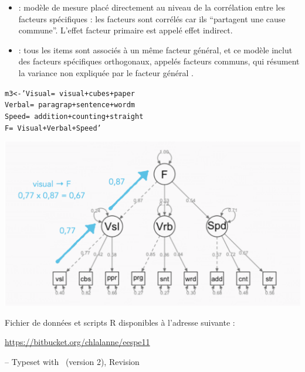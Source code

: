 
\begin{itemize}
\item {} : modèle de mesure placé directement au
  niveau de la corrélation entre les facteurs spécifiques : les facteurs sont
  corrélés car ils \enquote{partagent une cause commune}. L'effet facteur
  primaire est appelé effet indirect.
\item {} : tous les items sont associés à un même
  facteur général, et ce modèle inclut des facteurs spécifiques orthogonaux,
  appelés facteurs communs, qui résument la variance non expliquée par le
  facteur général \autocite{reise10}.
\end{itemize}


\begin{alltt}
m3 <- 'Visual =~ visual + cubes + paper
       Verbal =~ paragrap + sentence + wordm
       Speed  =~ addition + counting + straight
       F =~ Visual + Verbal + Speed'
\end{alltt}

{\centering \includegraphics[width=.5\textwidth]{figs/m4.eps}\par}


\foilhead{}

Fichier de données et scripts R disponibles à l'adresse suivante :\newline
{\centering \url{https://bitbucket.org/chlalanne/eespe11}\par}
\vfill

\raggedleft \scriptsize -- Typeset with \FoilTeX\ (version 2), Revision \VCRevision


